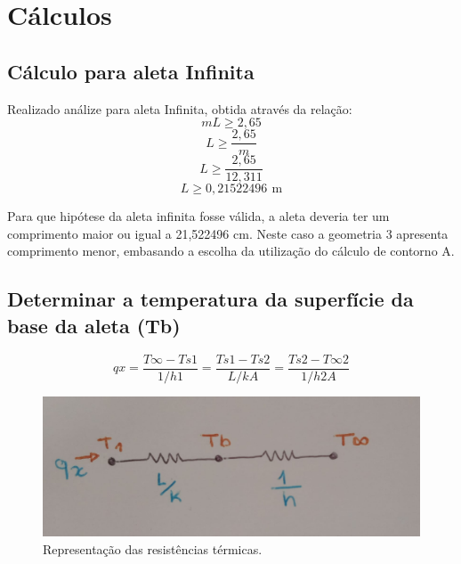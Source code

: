 \chapter{Cálculos}\label{cap:calculus}

\section{Cálculo para aleta Infinita}\label{sec:infity}

Realizado análize para aleta Infinita, obtida através da relação:\\
\begin{equation}
    {m}{L}\geq{2,65}
\end{equation}
\begin{equation}
    {L}\geq{\frac{2,65}{m}}
\end{equation}
\begin{equation}
    {L}\geq{\frac{2,65}{12,311 }}
\end{equation}
\begin{equation}
    {L}\geq{0,21522496\,\SI{}{\meter}}
\end{equation}
\par Para que hipótese da aleta infinita fosse válida, a aleta deveria ter um
comprimento maior ou igual a 21,522496 cm.
Neste caso a geometria 3 apresenta comprimento menor, embasando a
escolha da utilização do cálculo de contorno A.

\section{Determinar a temperatura da superfície da base da aleta (Tb)}\label{sec:prob1}

\begin{equation}
    {qx}={\frac{T\infty-Ts1}{1/{h1}}}={\frac{Ts1-Ts2}{L/{{k}{A}}}}={\frac{Ts2-T\infty2}{1/{h2}{A}}}
\end{equation}

\begin{figure}[h]
    \centering
    \caption{Representação das resistências térmicas.}
    \label{fig:res}
    \includegraphics[width=14cm]{figuras/resistenciasTermicas.jpeg}
    \fonteproprioautor
\end{figure}

